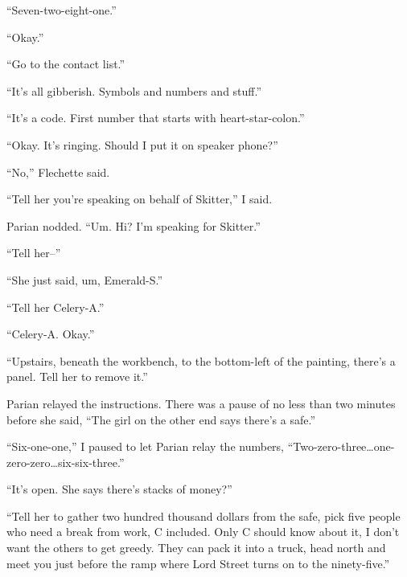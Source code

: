 ``Seven-two-eight-one.''



``Okay.''



``Go to the contact list.''



``It's all gibberish.  Symbols and numbers and stuff.''



``It's a code.  First number that starts with heart-star-colon.''



``Okay.  It's ringing.  Should I put it on speaker phone?''



``No,'' Flechette said.



``Tell her you're speaking on behalf of Skitter,'' I said.



Parian nodded.  ``Um.  Hi?  I'm speaking for Skitter.''



``Tell her--''



``She just said, um, Emerald-S.''



``Tell her Celery-A.''



``Celery-A.  Okay.''



``Upstairs, beneath the workbench, to the bottom-left of the painting, there's a panel.  Tell her to remove it.''



Parian relayed the instructions.  There was a pause of no less than two minutes before she said,  ``The girl on the other end says there's a safe.''



``Six-one-one,'' I paused to let Parian relay the numbers, ``Two-zero-three\ldots one-zero-zero\ldots six-six-three.''



``It's open.  She says there's stacks of money?''



``Tell her to gather two hundred thousand dollars from the safe, pick five people who need a break from work, C included.  Only C should know about it, I don't want the others to get greedy.  They can pack it into a truck, head north and meet you just before the ramp where Lord Street turns on to the ninety-five.''



